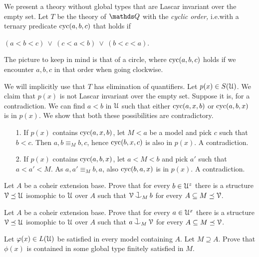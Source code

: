 \begin{example}\label{ex_cyclic_order}
  We present a theory without global types that are Lascar invariant over the empty set.
  Let $T$ be the theory of $\QQ$ with the \emph{cyclic order,} i.e.\@ with a ternary predicate ${\rm cyc}(a, b, c)$ that  holds if

  \hfil $(a < b < c)\ \vee\ (c < a < b)\ \vee\ (b < c < a)$.

  The picture to keep in mind is that of a circle, where ${\rm cyc}(a, b, c)$ holds if we encounter $a,b,c$ in that order when going clockwise.

  We will implicitly use that $T$ has elimination of quantifiers.
  Let $p(x)\in S(\EuScript U)$.
  We claim that $p(x)$ is not Lascar invariant over the empty set.
  Suppose it is, for a contradiction.
  We can find $a<b$ in $\EuScript U$ such that either ${\rm cyc}(a, x, b)$ or ${\rm cyc}(a, b, x)$ is in $p(x)$.
  We show that both these possibilities are contradictory.
  \begin{itemize}
  \item[1.] If $p(x)$ contains ${\rm cyc}(a, x, b)$,
  let $M<a$ be a model and pick $c$ such that $b<c$.
  Then $a, b \equiv_M b, c$, hence ${\rm cyc}(b, x, c)$ is also in $p(x)$.
  A contradiction.
  \item[2.] If $p(x)$ contains ${\rm cyc}(a, b, x)$,
  let $a<M<b$ and pick $a'$ such that $a<a'<M$. 
  As $a, a' \equiv_M b,a$, also  ${\rm cyc}(b, a, x)$ is in $p(x)$.
  A contradiction.
  \end{itemize}
\end{example}

\begin{exercise}
  Let $A$ be a coheir extension base.
  Prove that for every $b\in\EuScript U^z$ there is a structure $\EuScript V\preceq\EuScript U$ isomophic to $\EuScript U$ over $A$ such that $\V\cnonfork_Mb$ for every $A\subseteq M\preceq\EuScript V$.
\end{exercise}

\begin{exercise}
  Let $A$ be a coheir extension base.
  Prove that for every $a\in\EuScript U^x$ there is a structure $\EuScript V\preceq\EuScript U$ isomophic to $\EuScript U$ over $A$ such that $a\cnonfork_M\V$ for every $A\subseteq M\preceq\EuScript V$.
\end{exercise}


\begin{exercise}
  Let $\varphi(x)\in L(\EuScript U)$ be satisfied in every model containing $A$.
  Let $M\supseteq A$.  
  Prove that $\phi(x)$ is contained in some global type finitely satisfied in $M$.
\end{exercise}

